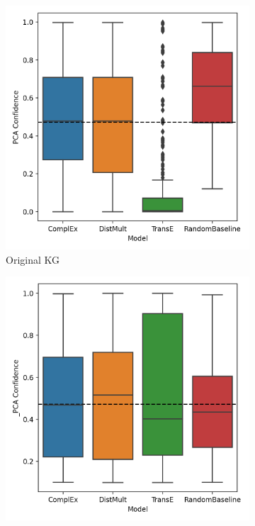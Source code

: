 \begin{figure}[h]
\centering
\begin{subfigure}{.5\textwidth}
  \centering
  \includegraphics[width=1\linewidth]{figures/results/PCA_models/PCA-models_family.png}
  \caption{Original KG}
  \label{fig:models_family_boxplot_sub}
\end{subfigure}%
\begin{subfigure}{.5\textwidth}
  \centering
  \includegraphics[width=1\linewidth]{figures/results/PCA_models/_PCA-models_family.png}

\end{subfigure}
\end{figure}
